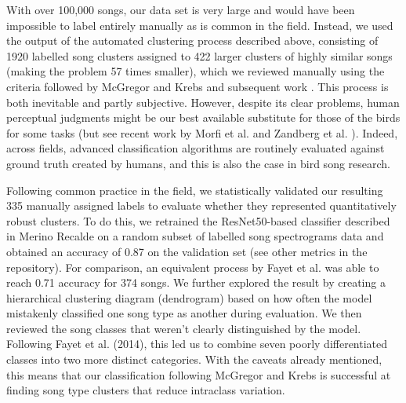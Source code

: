 \documentclass[9pt, onecolumn, twoside, lineno]{gsajnl}
\begin{document}
With over 100,000 songs, our data set is very large and would have been impossible to label entirely manually as is common in the field. Instead, we used the output of the automated clustering process described above, consisting of 1920 labelled song clusters assigned to 422 larger clusters of highly similar songs (making the problem 57 times smaller), which we reviewed manually using the criteria followed by McGregor and Krebs \autocite{mcgregor1982b, mcgregor1982, mcgregor1981} and subsequent work \autocite{baker1987, falls1982, fayet2014, hutfluss2022}. This process is both inevitable and partly subjective. However, despite its clear problems, human perceptual judgments might be our best available substitute for those of the birds for some tasks (but see recent work by Morfi et al. \autocite{morfi2021} and  Zandberg et al. \autocite{zandberg2022}). Indeed, across fields, advanced classification algorithms are routinely evaluated against ground truth created by humans, and this is also the case in bird song research.

Following common practice in the field, we statistically validated our resulting 335 manually assigned labels to evaluate whether they represented quantitatively robust clusters. To do this, we retrained the ResNet50-based classifier described in Merino Recalde \autocite{merinorecalde2023} on a random subset of labelled song spectrograms data and obtained an accuracy of 0.87 on the validation set (see other metrics in the repository). For comparison, an equivalent process by Fayet et al. \autocite{fayet2014} was able to reach 0.71 accuracy for 374 songs. We further explored the result by creating a hierarchical clustering diagram (dendrogram) based on how often the model mistakenly classified one song type as another during evaluation. We then reviewed the song classes that weren't clearly distinguished by the model. Following Fayet et al.\autocite{fayet2014} (2014), this led us to combine seven poorly differentiated classes into two more distinct categories. With the caveats already mentioned, this means that our classification following McGregor and Krebs \autocite{mcgregor1982b} is successful at finding song type clusters that reduce intraclass variation.
\end{document}

